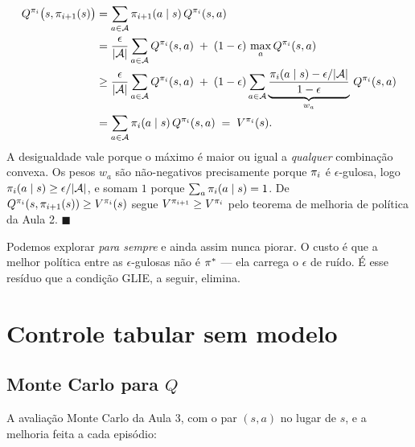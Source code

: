 \documentclass[11pt]{article}
\begin{document}
\begin{provabox}
  \begin{align*}
    Q^{\pi_i}\bigl(s, \pi_{i+1}(s)\bigr)
      &= \sum_{a \in \mathcal{A}} \pi_{i+1}(a\mid s)\, Q^{\pi_i}(s,a) \\
      &= \frac{\epsilon}{\lvert\mathcal{A}\rvert} \sum_{a \in \mathcal{A}} Q^{\pi_i}(s,a)
         \;+\; (1-\epsilon)\, \max_{a} Q^{\pi_i}(s,a) \\
      &\ge \frac{\epsilon}{\lvert\mathcal{A}\rvert} \sum_{a \in \mathcal{A}} Q^{\pi_i}(s,a)
         \;+\; (1-\epsilon) \sum_{a \in \mathcal{A}}
           \underbrace{\frac{\pi_i(a\mid s) - \epsilon/\lvert\mathcal{A}\rvert}{1-\epsilon}}_{w_a}\,
           Q^{\pi_i}(s,a) \\
      &= \sum_{a \in \mathcal{A}} \pi_i(a \mid s)\, Q^{\pi_i}(s,a) \;=\; V^{\pi_i}(s).
  \end{align*}
  A desigualdade vale porque o máximo é maior ou igual a \emph{qualquer}
  combinação convexa. Os pesos $w_a$ são não-negativos precisamente porque
  $\pi_i$ é $\epsilon$-gulosa, logo $\pi_i(a\mid s) \ge \epsilon/\lvert\mathcal{A}\rvert$, e
  somam $1$ porque $\sum_a \pi_i(a\mid s) = 1$. De
  $Q^{\pi_i}(s,\pi_{i+1}(s)) \ge V^{\pi_i}(s)$ segue
  $V^{\pi_{i+1}} \ge V^{\pi_i}$ pelo teorema de melhoria de política da
  Aula 2. \hfill$\blacksquare$
\end{provabox}

\begin{ideiabox}
  Podemos explorar \emph{para sempre} e ainda assim nunca piorar. O custo é que
  a melhor política entre as $\epsilon$-gulosas não é $\pi^{*}$ --- ela carrega
  o $\epsilon$ de ruído. É esse resíduo que a condição GLIE, a seguir, elimina.
\end{ideiabox}

\section{Controle tabular sem modelo}

\subsection{Monte Carlo para \texorpdfstring{$Q$}{Q}}

A avaliação Monte Carlo da Aula 3, com o par $(s,a)$ no lugar de $s$, e a
melhoria feita a cada episódio:
\end{document}

